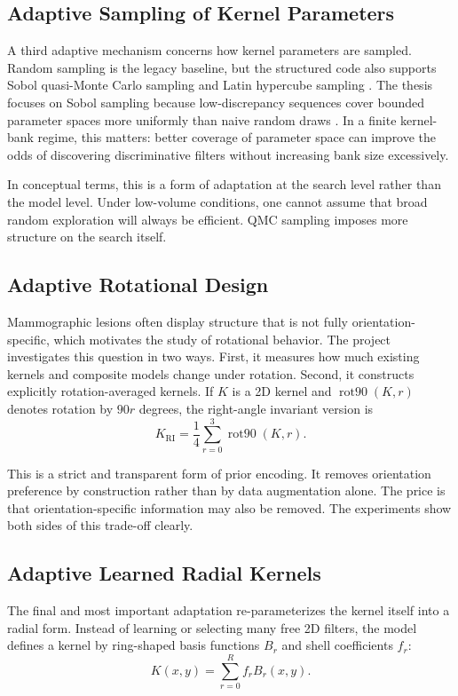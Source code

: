 \documentclass{cernatsnote}
\let\oldsubsection\subsection
\let\oldsubsubsection\subsubsection
\let\section\oldsubsection
\let\subsection\oldsubsubsection
\begin{document}
\section{Adaptive Sampling of Kernel Parameters}
A third adaptive mechanism concerns how kernel parameters are sampled. Random sampling is the legacy baseline, but the structured code also supports Sobol quasi-Monte Carlo sampling and Latin hypercube sampling \citep{mckay1979lhs}. The thesis focuses on Sobol sampling because low-discrepancy sequences cover bounded parameter spaces more uniformly than naive random draws \citep{sobol1967cube}. In a finite kernel-bank regime, this matters: better coverage of parameter space can improve the odds of discovering discriminative filters without increasing bank size excessively.

In conceptual terms, this is a form of adaptation at the search level rather than the model level. Under low-volume conditions, one cannot assume that broad random exploration will always be efficient. QMC sampling imposes more structure on the search itself.

\section{Adaptive Rotational Design}
Mammographic lesions often display structure that is not fully orientation-specific, which motivates the study of rotational behavior. The project investigates this question in two ways. First, it measures how much existing kernels and composite models change under rotation. Second, it constructs explicitly rotation-averaged kernels. If $K$ is a 2D kernel and $\operatorname{rot90}(K, r)$ denotes rotation by $90r$ degrees, the right-angle invariant version is
\[
K_{\text{RI}} = \frac{1}{4}\sum_{r=0}^{3}\operatorname{rot90}(K,r).
\]

This is a strict and transparent form of prior encoding. It removes orientation preference by construction rather than by data augmentation alone. The price is that orientation-specific information may also be removed. The experiments show both sides of this trade-off clearly.

\section{Adaptive Learned Radial Kernels}
The final and most important adaptation re-parameterizes the kernel itself into a radial form. Instead of learning or selecting many free 2D filters, the model defines a kernel by ring-shaped basis functions $B_r$ and shell coefficients $f_r$:
\[
K(x,y) = \sum_{r=0}^{R} f_r B_r(x,y).
\]
\end{document}
